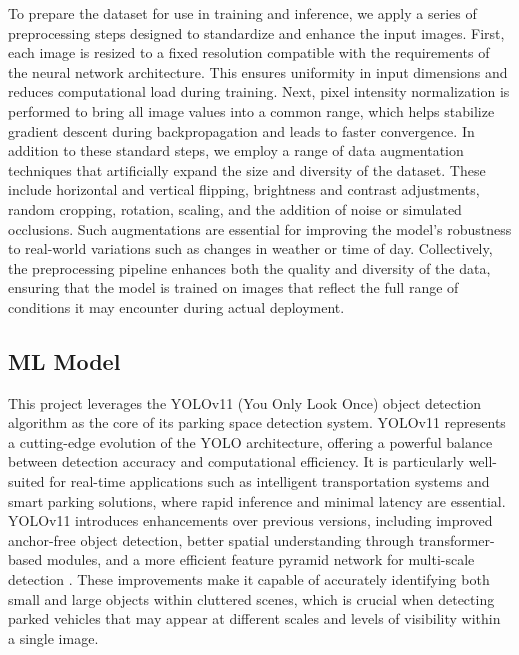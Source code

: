 \documentclass[conference]{IEEEtran}
\begin{document}
To prepare the dataset for use in training and inference, 
we apply a series of preprocessing steps designed to standardize and enhance the input images. 
First, 
each image is resized to a fixed resolution compatible with the requirements of the neural network architecture. 
This ensures uniformity in input dimensions and reduces computational load during training. 
Next, 
pixel intensity normalization is performed to bring all image values into a common range, 
which helps stabilize gradient descent during backpropagation and leads to faster convergence. 
In addition to these standard steps, 
we employ a range of data augmentation techniques that artificially expand the size and diversity of the dataset.
These include horizontal and vertical flipping, 
brightness and contrast adjustments, 
random cropping, 
rotation, 
scaling, 
and the addition of noise or simulated occlusions. 
Such augmentations are essential for improving the model’s robustness to real-world variations such as changes in weather or time of day. 
Collectively, 
the preprocessing pipeline enhances both the quality and diversity of the data, 
ensuring that the model is trained on images that reflect the full range of conditions it may encounter during actual deployment.

\subsection{ML Model}

This project leverages the YOLOv11 
(You Only Look Once) 
object detection algorithm \cite{yolo11_ultralytics}
as the core of its parking space detection system. 
YOLOv11 represents a cutting-edge evolution of the YOLO architecture, 
offering a powerful balance between detection accuracy and computational efficiency. 
It is particularly well-suited for real-time applications such as intelligent transportation systems and smart parking solutions, 
where rapid inference and minimal latency are essential. 
YOLOv11 introduces enhancements over previous versions, 
including improved anchor-free object detection, 
better spatial understanding through transformer-based modules, 
and a more efficient feature pyramid network for multi-scale detection \cite{yolo11_overview}. 
These improvements make it capable of accurately identifying both small and large objects within cluttered scenes, 
which is crucial when detecting parked vehicles that may appear at different scales and levels of visibility within a single image.
\end{document}
